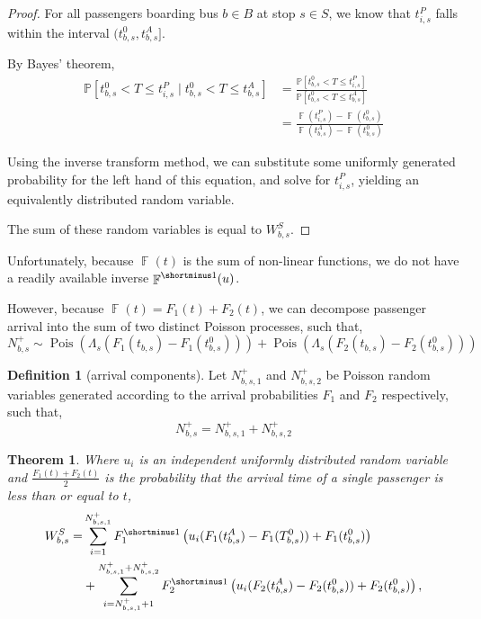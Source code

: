 \documentclass[12pt]{article}
\newtheorem{theorem}{Theorem}
\theoremstyle{definition}
\newtheorem{definition}{Definition}
\newcommand{\Prob}{\mathbb P}
\DeclareMathOperator{\Pois}{Pois}
\DeclareMathOperator{\F}{\mathbb F}
\newcommand{\inv}[1]{#1^{\shortminus 1}}
\begin{document}
\begin{proof}
    For all passengers boarding bus $b \in B$ at stop $s \in S$, we know that
    $t^P_{i,s}$ falls within the interval $(t^0_{b,s}, t^A_{b,s}]$.

    By Bayes' theorem,
    \begin{align*}
        \Prob[t^0_{b,s} < T \le t^P_{i,s}
        \mid t^0_{b,s} < T \le t^A_{b,s}]
        &=
        \frac{\Prob[t^0_{b,s} < T \le t^P_{i,s}]}
        {\Prob[t^0_{b,s} < T \le t^A_{b,s}]}\\
        &=
        \frac{\F(t^P_{i,s}) - \F(t^0_{b,s})}
        {\F(t^A_{b,s}) - \F(t^0_{b,s})}
    \end{align*}

Using the inverse transform method, we can substitute some uniformly generated
probability for the left hand of this equation, and solve for $t^P_{i,s}$,
yielding an equivalently distributed random variable.

The sum of these random variables is equal to $W^S_{b,s}$.

\end{proof}

Unfortunately, because $\F(t)$ is the sum of non-linear functions, we do not
have a readily available inverse $\inv\F(u)$.

However, because $\F(t) = F_1(t) + F_2(t)$, we can decompose passenger arrival
into the sum of two distinct Poisson processes, such that,
\[
    N^+_{b,s} \sim \Pois\left(
            \Lambda_s \left(F_1(t_{b,s}) - F_1(t^0_{b,s})\right)
        \right)
        + \Pois\left(
            \Lambda_s \left(F_2(t_{b,s}) - F_2(t^0_{b,s})\right)
        \right)
\]

\begin{definition}[arrival components]
    \hfill\par\nopagebreak
    Let $N^+_{b,s,1}$ and $N^+_{b,s,2}$ be Poisson random variables generated
    according to the arrival probabilities $F_1$ and $F_2$ respectively, such
    that,
    \[
        N^+_{b,s} = N^+_{b,s,1} + N^+_{b,s,2}
    \]
    \label{def:components}
\end{definition}

\begin{theorem}
    Where $u_i$ is an independent uniformly distributed random variable and
    $\frac{F_1(t) + F_2(t)}{2}$ is the probability that the arrival time of a
    single passenger is less than or equal to $t$,
    \[
    \begin{split}
        W^S_{b,s} = 
        &\sum_{i=1}^{N^+_{b,s,1}}
        \inv{F_1}\left(
            u_i(F_1(t^A_{b,s}) - F_1(T^0_{b,s}))
            + F_1(t^0_{b,s})
        \right)\\
        &+
        \sum_{i=N^+_{b,s,1}+1}^{N^+_{b,s,1} + N^+_{b,s,2}}
        \inv{F_2}\left(
            u_i(F_2(t^A_{b,s}) - F_2(t^0_{b,s}))
            + F_2(t^0_{b,s})
        \right),
    \end{split}
\]
\end{theorem}
\end{document}
